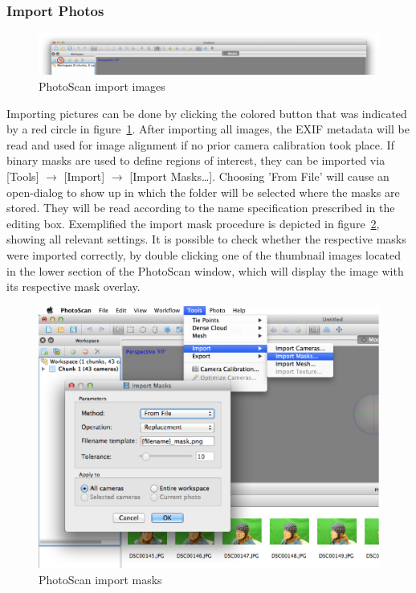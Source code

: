 \documentclass[12pt,a4paper]{scrartcl}
\begin{document}
\subsubsection{Import Photos}
\begin{figure}[!h]
  \includegraphics[width=1\textwidth]{PhotoScan-importimages}
  \caption{PhotoScan import images}
    \smallskip
\footnotesize
\begin{changemargin}{0.5cm}{0.5cm}
\end{changemargin}
  \label{fig:photoscanimpimg}
\end{figure}
Importing pictures can be done by clicking the colored button that was indicated by a red circle in figure~\ref{fig:photoscanimpimg}. After importing all images, the EXIF metadata will be read and used for image alignment if no prior camera calibration took place.
If binary masks are used to define regions of interest, they can be imported via [Tools] $\rightarrow$ [Import] $\rightarrow$ [Import Masks\dots]. Choosing 'From File' will cause an open-dialog to show up in which the folder will be selected where the masks are stored. They will be read according to the name specification prescribed in the editing box. Exemplified the import mask procedure is depicted in figure~\ref{fig:photoscanimpmask}, showing all relevant settings. It is possible to check whether the respective masks were imported correctly, by double clicking one of the thumbnail images located in the lower section of the PhotoScan window, which will display the image with its respective mask overlay.
\begin{figure}[!h]
  \includegraphics[width=1\textwidth]{PhotoScan-importmasks}
  \caption{PhotoScan import masks}
  \label{fig:photoscanimpmask}
\end{figure}
\FloatBarrier
\end{document}
